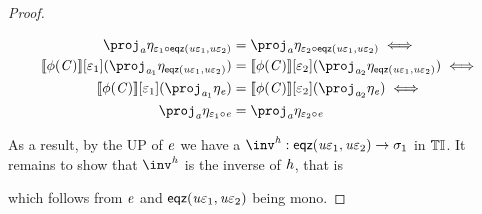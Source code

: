 \begin{proof}
\begin{itemize}
            \begin{align*}
                \proj_\va \mvarM_{\me_1 \comp \eqz{\tinstU\me_1}{\tinstU\me_2}} & = \proj_\va \mvarM_{\me_2 \comp \eqz{\tinstU\me_1}{\tinstU\me_2}} \iff \\
                \sem{\phi(\vC)}\anyL{\me_1}(\proj_{\va_1} \mvarM_{\eqz{\tinstU\me_1}{\tinstU\me_2}}) & = 
                \sem{\phi(\vC)}\anyL{\me_2}(\proj_{\va_2} \mvarM_{\eqz{\tinstU\me_1}{\tinstU\me_2}}) \iff \\
                \sem{\phi(\vC)}\anyL{\me_1}(\proj_{\va_1} \mvarM_\ve) & = 
                \sem{\phi(\vC)}\anyL{\me_2}(\proj_{\va_2} \mvarM_\ve) \iff \\
                \proj_\va \mvarM_{\me_1 \comp \ve} & = \proj_\va \mvarM_{\me_2 \comp \ve}
            \end{align*}
    \end{itemize}


    As a result, by the UP of $\mathit{e}$ we have a $\inv^\vh : \eqz{\tinstU\me_1}{\tinstU\me_2} \to \sigma_1$ in ${\mathbb{T}\mathbb{I}}$.
    It remains to show that $\inv^\vh$ is the inverse of $\mathit{h}$, that is
    \begin{center}
    \end{center}
    which follows from $\mathit{e}$ and $\mathsf{eqz}(\mathit{u}\varepsilon_1, \mathit{u}\varepsilon_2)$ being mono.
\end{proof}

